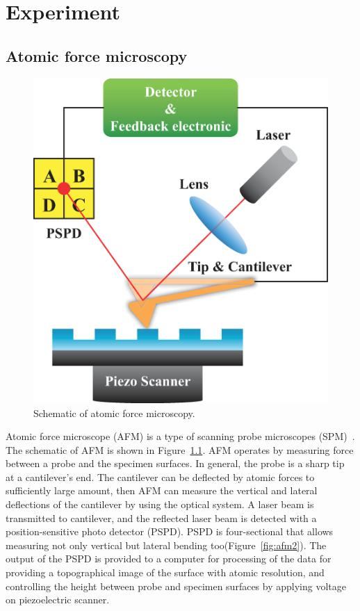 \chapter{Experiment}
\label{c:exp}

\section{Atomic force microscopy}

\begin{figure}[htb]
\centering
\includegraphics[scale=0.35]{EXP/afm1.eps}
\caption{\label{fig:afm1}Schematic of atomic force microscopy.}
\end{figure}
Atomic force microscope (AFM) is a type of scanning probe microscopes (SPM)~\cite{bennig1988atomic}.  The schematic of AFM is shown in Figure~\ref{fig:afm1}. AFM operates by measuring force between a probe and the specimen surfaces. In general,  the probe is a sharp tip at a cantilever's end. The cantilever can be deflected by atomic forces to sufficiently large amount, then AFM can measure the vertical and lateral deflections of the cantilever by using the optical system. A laser beam is transmitted to cantilever, and the reflected laser beam is detected with a position-sensitive photo detector (PSPD). PSPD is four-sectional that allows measuring not only vertical but lateral bending too(Figure~\ref{fig:afm2}). The output of the PSPD is provided to a computer for processing of the data for providing a topographical image of the surface with atomic resolution, and controlling the height between probe and specimen surfaces by applying voltage on piezoelectric scanner.
